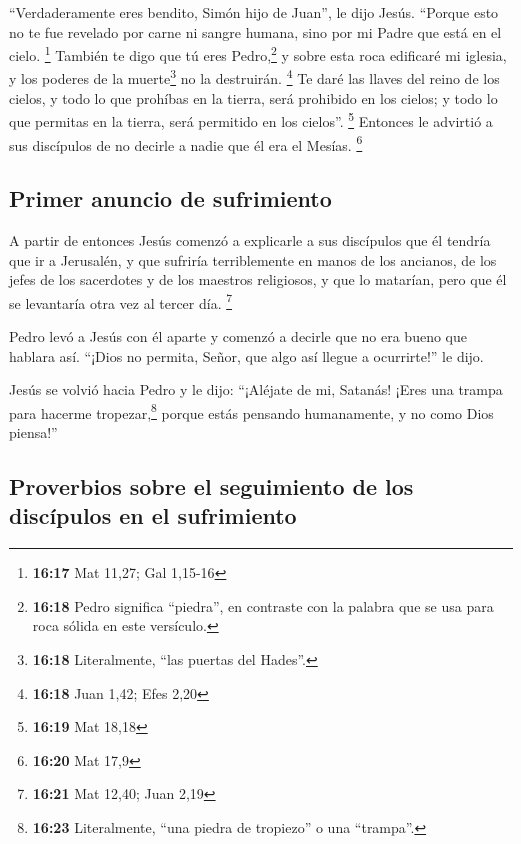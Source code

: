  ``Verdaderamente eres bendito, Simón hijo de Juan'', le
dijo Jesús. ``Porque esto no te fue revelado por carne ni sangre humana,
sino por mi Padre que está en el cielo. \footnote{\textbf{16:17} Mat
  11,27; Gal 1,15-16}  También te digo que tú eres
Pedro,\footnote{\textbf{16:18} Pedro significa ``piedra'', en contraste
  con la palabra que se usa para roca sólida en este versículo.} y sobre
esta roca edificaré mi iglesia, y los poderes de la muerte\footnote{\textbf{16:18}
  Literalmente, ``las puertas del Hades''.} no la destruirán.
\footnote{\textbf{16:18} Juan 1,42; Efes 2,20}  Te daré
las llaves del reino de los cielos, y todo lo que prohíbas en la tierra,
será prohibido en los cielos; y todo lo que permitas en la tierra, será
permitido en los cielos''. \footnote{\textbf{16:19} Mat 18,18}
 Entonces le advirtió a sus discípulos de no decirle a
nadie que él era el Mesías. \footnote{\textbf{16:20} Mat 17,9}

\hypertarget{primer-anuncio-de-sufrimiento}{%
\subsection{Primer anuncio de
sufrimiento}\label{primer-anuncio-de-sufrimiento}}

 A partir de entonces Jesús comenzó a explicarle a sus
discípulos que él tendría que ir a Jerusalén, y que sufriría
terriblemente en manos de los ancianos, de los jefes de los sacerdotes y
de los maestros religiosos, y que lo matarían, pero que él se levantaría
otra vez al tercer día. \footnote{\textbf{16:21} Mat 12,40; Juan 2,19}

 Pedro levó a Jesús con él aparte y comenzó a decirle que
no era bueno que hablara así. ``¡Dios no permita, Señor, que algo así
llegue a ocurrirte!'' le dijo.

 Jesús se volvió hacia Pedro y le dijo: ``¡Aléjate de mi,
Satanás! ¡Eres una trampa para hacerme tropezar,\footnote{\textbf{16:23}
  Literalmente, ``una piedra de tropiezo'' o una ``trampa''.} porque
estás pensando humanamente, y no como Dios piensa!''

\hypertarget{proverbios-sobre-el-seguimiento-de-los-discuxedpulos-en-el-sufrimiento}{%
\subsection{Proverbios sobre el seguimiento de los discípulos en el
sufrimiento}\label{proverbios-sobre-el-seguimiento-de-los-discuxedpulos-en-el-sufrimiento}}

